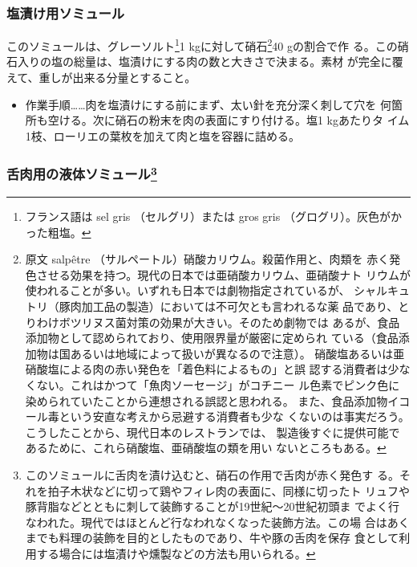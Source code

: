 
 
\begin{recette}
\hypertarget{saumure-au-sel}{%
\subsubsection{塩漬け用ソミュール}\label{saumure-au-sel}}



このソミュールは、グレーソルト\footnote{フランス語は sel gris
  （セルグリ）または gros gris （グログリ）。灰色がかった粗塩。}1
kgに対して硝石\footnote{原文 salpêtre
  （サルペートル）硝酸カリウム。殺菌作用と、肉類を
  赤く発色させる効果を持つ。現代の日本では亜硝酸カリウム、亜硝酸ナト
  リウムが使われることが多い。いずれも日本では劇物指定されているが、
  シャルキュトリ（豚肉加工品の製造）においては不可欠とも言われるな薬
  品であり、とりわけボツリヌス菌対策の効果が大きい。そのため劇物では
  あるが、食品添加物として認められており、使用限界量が厳密に定められ
  ている（食品添加物は国あるいは地域によって扱いが異なるので注意）。
  硝酸塩あるいは亜硝酸塩による肉の赤い発色を「着色料によるもの」と誤
  認する消費者は少なくない。これはかつて「魚肉ソーセージ」がコチニー
  ル色素でピンク色に染められていたことから連想される誤認と思われる。
  また、食品添加物イコール毒という安直な考えから忌避する消費者も少な
  くないのは事実だろう。こうしたことから、現代日本のレストランでは、
  製造後すぐに提供可能であるために、これら硝酸塩、亜硝酸塩の類を用い
  ないところもある。}40 gの割合で作
る。この硝石入りの塩の総量は、塩漬けにする肉の数と大きさで決まる。素材
が完全に覆えて、重しが出来る分量とすること。

\begin{itemize}
\tightlist
\item
  作業手順\ldots{}\ldots{}肉を塩漬けにする前にまず、太い針を充分深く刺して穴を
  何箇所も空ける。次に硝石の粉末を肉の表面にすり付ける。塩1 kgあたりタ
  イム1枝、ローリエの葉\undemi{}枚を加えて肉と塩を容器に詰める。
\end{itemize}

\hypertarget{saumure-liquide-pour-langues}{%
\subsubsection[舌肉用の液体ソミュール]{\texorpdfstring{舌肉用の液体ソミュール\footnote{このソミュールに舌肉を漬け込むと、硝石の作用で舌肉が赤く発色す
  る。それを拍子木状などに切って鶏やフィレ肉の表面に、同様に切ったト
  リュフや豚背脂などとともに刺して装飾することが19世紀〜20世紀初頭ま
  でよく行なわれた。現代ではほとんど行なわれなくなった装飾方法。この場
  合はあくまでも料理の装飾を目的としたものであり、牛や豚の舌肉を保存
  食として利用する場合には塩漬けや燻製などの方法も用いられる。}}{舌肉用の液体ソミュール}}\label{saumure-liquide-pour-langues}}


\end{recette}
